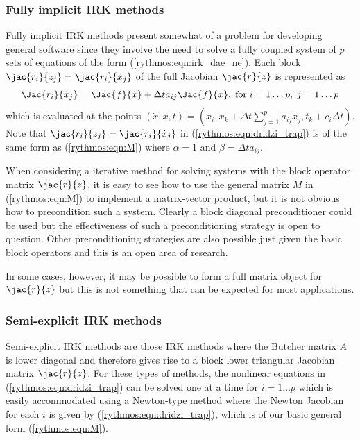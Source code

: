 \documentclass[pdf,ps2pdf,11pt]{SANDreport}
\begin{document}
\subsubsection*{Fully implicit IRK methods}

Fully implicit IRK methods present somewhat of a problem for developing
general software since they involve the need to solve a fully coupled system
of $p$ sets of equations of the form (\ref{rythmos:eqn:irk_dae_ne}).  Each
block $\jac{r_i}{z_j} = {}\jac{r_i}{\dot{x}_j}$ of the full Jacobian
$\jac{r}{z}$ is represented as
%
\begin{equation}
\Jac{r_i}{\dot{x}_j}
= \Jac{f}{\dot{x}}
+ \Delta t a_{ij} \Jac{f}{x},
\; \mbox{for} \; i = 1 \ldots p, \; j = 1 \ldots p
\label{rythmos:eqn:dridzi_trap}
\end{equation}
%
which is evaluated at the points $(\dot{x},x,t) = ( {}\dot{x}_i, x_k +
{}\Delta t {}\sum_{j=1}^{p} a_{ij} {}\dot{x}_j, t_k + c_i {}\Delta t )$.  Note
that $\jac{r_i}{z_j} = {}\jac{r_i}{\dot{x}_j}$ in
(\ref{rythmos:eqn:dridzi_trap}) is of the same form as (\ref{rythmos:eqn:M})
where $\alpha = 1$ and $\beta = \Delta t a_{ij}$.

When considering a iterative method for solving systems with the block
operator matrix $\jac{r}{z}$, it is easy to see how to use the general matrix
$M$ in (\ref{rythmos:eqn:M}) to implement a matrix-vector product, but it is
not obvious how to precondition such a system.  Clearly a block diagonal
preconditioner could be used but the effectiveness of such a preconditioning
strategy is open to question.  Other preconditioning strategies are also
possible just given the basic block operators and this is an open area of
research.

In some cases, however, it may be possible to form a full matrix object for
$\jac{r}{z}$ but this is not something that can be expected for most
applications.

\subsubsection*{Semi-explicit IRK methods}

Semi-explicit IRK methods are those IRK methods where the Butcher matrix $A$
is lower diagonal and therefore gives rise to a block lower triangular
Jacobian matrix $\jac{r}{z}$.  For these types of methods, the nonlinear
equations in (\ref{rythmos:eqn:dridzi_trap}) can be solved one at a time for
$i = 1 {}\ldots p$ which is easily accommodated using a Newton-type method
where the Newton Jacobian for each $i$ is given by
(\ref{rythmos:eqn:dridzi_trap}), which is of our basic general form
(\ref{rythmos:eqn:M}).
\end{document}
